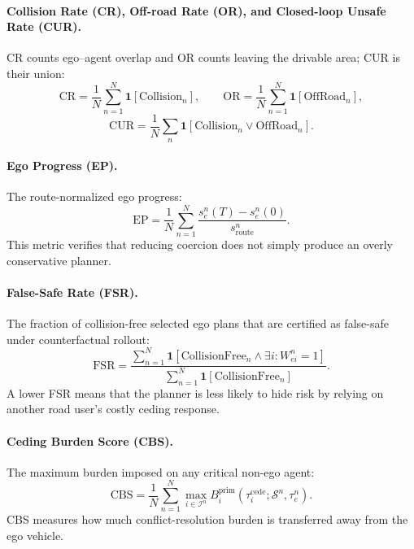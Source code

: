 \documentclass[10pt]{article}
\begin{document}
\paragraph{Collision Rate (CR), Off-road Rate (OR), and Closed-loop Unsafe Rate (CUR).}
CR counts ego--agent overlap and OR counts leaving the drivable area; CUR is their union:
\begin{equation}
    \mathrm{CR}=\frac{1}{N}\sum_{n=1}^{N}\mathbf{1}[\mathrm{Collision}_n],
    \qquad
    \mathrm{OR}=\frac{1}{N}\sum_{n=1}^{N}\mathbf{1}[\mathrm{OffRoad}_n],
\end{equation}
\begin{equation}
    \mathrm{CUR}=\frac{1}{N}\sum_n\mathbf{1}[\mathrm{Collision}_n\vee\mathrm{OffRoad}_n].
\end{equation}

\paragraph{Ego Progress (EP).}
The route-normalized ego progress:
\begin{equation}
    \mathrm{EP}
    =
    \frac{1}{N}
    \sum_{n=1}^{N}
    \frac{
    s^{n}_{e}(T)-s^{n}_{e}(0)
    }{
    s^{n}_{\mathrm{route}}
    }.
\end{equation}
This metric verifies that reducing coercion does not simply produce an overly conservative planner.

\paragraph{False-Safe Rate (FSR).}
The fraction of collision-free selected ego plans that are certified as false-safe under counterfactual rollout:
\begin{equation}
    \mathrm{FSR}
    =
    \frac{
    \sum_{n=1}^{N}
    \mathbf{1}
    [
    \mathrm{CollisionFree}_n
    \wedge
    \exists i: W^n_{ei}=1
    ]
    }{
    \sum_{n=1}^{N}
    \mathbf{1}
    [
    \mathrm{CollisionFree}_n
    ]
    }.
\end{equation}
A lower FSR means that the planner is less likely to hide risk by relying on another road user's costly ceding response.

\paragraph{Ceding Burden Score (CBS).}
The maximum burden imposed on any critical non-ego agent:
\begin{equation}
    \mathrm{CBS}
    =
    \frac{1}{N}
    \sum_{n=1}^{N}
    \max_{i\in\mathcal{I}^n}
    B_i^{\mathrm{prim}}(\tau_i^{\mathrm{cede}};\mathcal{S}^n,\tau^n_e).
\end{equation}
CBS measures how much conflict-resolution burden is transferred away from the ego vehicle.
\end{document}
